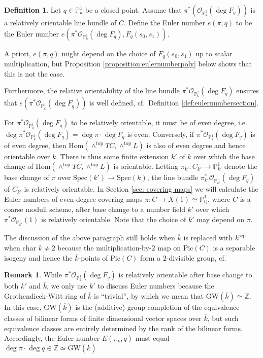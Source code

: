 \documentclass[12pt, reqno]{amsart}
\theoremstyle{definition}
\newtheorem{remark}[theorem]{Remark}
\newtheorem{definition}[theorem]{Definition}
\newcommand{\Spec}{\mathrm{Spec }} %
\newcommand{\Proj}{\mathbb{P}} %
\newcommand{\GW}{\mathrm{GW}} %
\newcommand{\Oh}{\mathscr{O}} %
\newcommand{\Hom}{\text{Hom}}
\begin{document}
\begin{definition} \label{def:eulernumber}
Let $q \in \Proj^1_k$ be a closed point. Assume that $\pi^*(\mathscr{O}_{\Proj^1_k}(\deg F_q))$ is a relatively orientable line bundle of $C$. Define the Euler number $e(\pi,q)$ to be the Euler number $e(\pi^* \mathscr{O}_{\Proj^1_k}(\deg F_q), F_q(s_0,s_1))$. 
\end{definition}

A priori, $e(\pi,q)$ might depend on the choice of $F_q(s_0,s_1)$ up to scalar multiplication, but Proposition \ref{proposition:eulernumberpoly} below shows that this is not the case.


Furthermore, the relative orientability of the line bundle $\pi^* \Oh_{\Proj^1_k}(\deg F_q)$ ensures that $e(\pi^* \mathscr{O}_{\Proj^1_k}(\deg F_q))$ is well defined, cf.~Definition \ref{def:eulernumbersection}.

For $\pi^*\mathscr{O}_{\Proj^1_k}(\deg F_q)$ to be relatively orientable, it must be of even degree, i.e. $\deg \pi^* \mathscr{O}_{\Proj^1_k} (\deg F_q) = \deg \pi \cdot \deg F_q$ is even. Conversely, if $\pi^* \mathscr{O}_{\Proj^1_k}(\deg F_q)$ is of even degree, then $\Hom(\wedge^{\text{top}} TC, \wedge^{\text{top}} L)$ is also of even degree and hence orientable over $\overline{k}$. There is thus some finite extension $k'$ of $k$ over which the base change of $\Hom(\wedge^{\text{top}} TC, \wedge^{\text{top}} L)$ is orientable. Letting $\pi_{k'}: C_{k'} \rightarrow \mathbb{P}^1_{k'}$ denote the base change of $\pi$ over $\Spec(k') \rightarrow \Spec(k)$, the line bundle $\pi^*_{k'} \mathscr{O}_{\Proj^1_{k'}}(\deg F_q)$ of $C_{k'}$ is relatively orientable. In Section \ref{sec: covering maps} we will calculate the Euler numbers of even-degree covering maps $\pi: C \rightarrow X(1) \simeq \mathbb{P}^1_\mathbb{Q}$, where $C$ is a coarse moduli scheme, after base change to a number field $k'$ over which $\pi^* \mathscr{O}_{\Proj^1_{k'}}(1)$ is relatively orientable. Note that the choice of $k'$ may depend on $\pi$. 

The discussion of the above paragraph still holds when $\overline{k}$ is replaced with $k^\text{sep}$ when $\text{char } k \neq 2$ because the multiplication-by-$2$ map on $\text{Pic}(C)$ is a separable isogeny and hence the $\overline{k}$-points of $\text{Pic}(C)$ form a $2$-divisible group, cf. \cite[Proposition 5.9 and Corollary 5.10]{vm11}


\begin{remark}
While $ \pi^* \mathscr{O}_{\Proj^1_k} (\deg F_q)$ is relatively orientable after base change to both $k'$ and $\overline{k}$, we only use $k'$ to discuss Euler numbers because the Grothendieck-Witt ring of $\overline{k}$ is ``trivial'', by which we mean that $\GW(\overline{k}) \simeq \mathbb{Z}$. In this case, $\GW(\overline{k})$ is the (additive) group completion of the equivalence classes of bilinear forms of finite dimensional vector spaces over $\overline{k}$, but such equivalence classes are entirely determined by the rank of the bilinear forms. Accordingly, the Euler number $E(\pi_{\overline{k}},q)$ must equal $\deg \pi \cdot \deg q \in \mathbb{Z} \simeq \GW(\overline{k})$
\end{remark}
\end{document}

